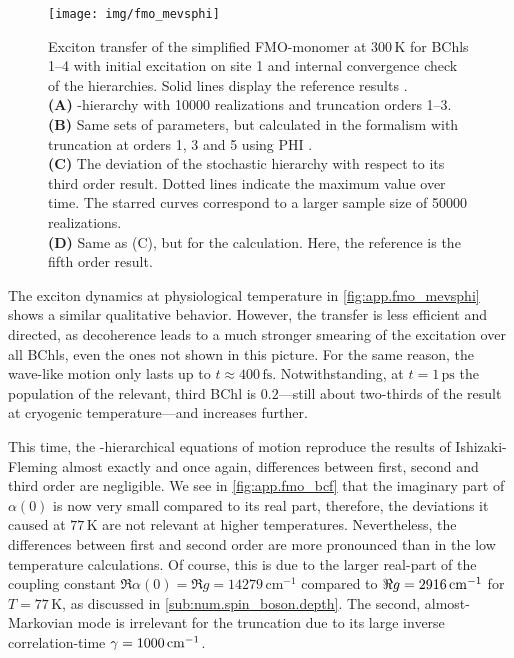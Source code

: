 \begin{figure}[p]
  \centering
  \texttt{[image: img/fmo\_mevsphi]}
  \caption{%
    Exciton transfer of the simplified FMO-monomer at 300\,K for BChls 1--4 with initial excitation on site 1 and internal convergence check of the hierarchies.
    Solid lines display the reference results \cite{IsFl09_fmo}.\\
    \textbf{(A)} \NMSSE-hierarchy with 10000 realizations and truncation orders 1--3.\\
    \textbf{(B)} Same sets of parameters, but calculated in the \HEOM formalism with truncation at orders 1, 3 and 5 using \textsc{PHI} \cite{StSc12_heom}.\\
    \textbf{(C)} The deviation of the stochastic hierarchy with respect to its third order result. Dotted lines indicate the maximum value over time. The starred curves correspond to a larger sample size of 50000 realizations.\\
    \textbf{(D)} Same as (C), but for the \HEOM calculation. Here, the reference is the fifth order result.
  }
  \label{fig:app.fmo_mevsphi}
\end{figure}

The exciton dynamics at physiological temperature in \autoref{fig:app.fmo_mevsphi} shows a similar qualitative behavior.
However, the transfer is less efficient and directed, as decoherence leads to a much stronger smearing of the excitation over all BChls, even the ones not shown in this picture.
For the same reason, the wave-like motion only lasts up to $t \approx 400\,\mathrm{fs}$.
Notwithstanding, at $t = 1\,\mathrm{ps}$ the population of the relevant, third BChl is $0.2$---still about two-thirds of the result at cryogenic temperature---and increases further.

This time, the \NMSSE-hierarchical equations of motion reproduce the results of Ishizaki-Fleming almost exactly and once again, differences between first, second and third order are negligible.
We see in \autoref{fig:app.fmo_bcf} that the imaginary part of $\alpha(0)$ is now very small compared to its real part, therefore, the deviations it caused at $77\,\mathrm{K}$ are not relevant at higher temperatures.
Nevertheless, the differences between first and second order are more pronounced than in the low temperature calculations.
Of course, this is due to the larger real-part of the coupling constant $\Re\alpha(0) = \Re g=14279\,\mathrm{cm^{-1}}$ compared to $\Re g=2916\,\mathrm{cm}^{-1}$ for $T=77\,\mathrm{K}$, as discussed in \autoref{sub:num.spin_boson.depth}.
The second, almost-Markovian mode is irrelevant for the truncation due to its large inverse correlation-time $\gamma = 1000\,\mathrm{cm}^{-1}$.

